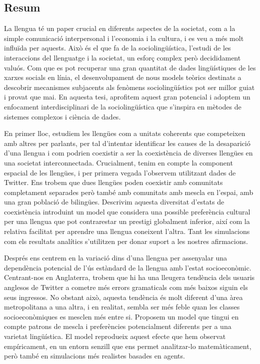 \documentclass[../thesis.tex]{subfiles}
\begin{document}
\begin{otherlanguage}{catalan}
\chapter*{Resum}
La llengua té un paper crucial en diferents aspectes de la societat, com a la simple comunicació interpersonal i l'economia i la cultura, i es veu a més molt influïda per aquests.
Això és
el que fa de la sociolingüística, l'estudi de les interaccions del llenguatge i la
societat, un esforç complex però decididament valuós. Com que es pot recuperar una gran
quantitat de dades lingüístiques de les xarxes socials en línia, el desenvolupament de
nous models teòrics destinats a descobrir mecanismes subjacents als fenòmens
sociolingüístics pot ser millor guiat i provat que mai. En aquesta tesi, aprofitem
aquest gran potencial i adoptem un enfocament interdisciplinari de la sociolingüística
que s'inspira en mètodes de sistemes complexos i ciència de dades.

En primer lloc, estudiem les llengües com a unitats coherents que competeixen amb altres
per parlants, per tal d'intentar identificar les causes de la desaparició d'una llengua i
com podrien coexistir a ser la coexistència de diverses llengües en una societat
interconnectada. Crucialment, tenim en compte la component espacial de les llengües, i
per primera vegada l'observem utilitzant dades de Twitter. Ens trobem que dues llengües poden
coexistir amb comunitats completament separades però també amb comunitats amb mescla en
l'espai, amb una gran població de bilingües. Descrivim aquesta diversitat d'estats de
coexistència introduint un model que considera una possible preferència cultural per una
llengua que pot contrarestar un prestigi globalment inferior, així com la relativa
facilitat per aprendre una llengua coneixent l'altra. Tant les simulacions com els
resultats analítics s'utilitzen per donar suport a les nostres afirmacions.

Després ens centrem en la variació dins d'una llengua per assenyalar una dependència
potencial de l'ús estàndard de la llengua amb l'estat socioeconòmic. Centrant-nos en
Anglaterra, trobem que hi ha una lleugera tendència dels usuaris anglesos de Twitter a
cometre més errors gramaticals com més baixos siguin els seus ingressos. No obstant
això, aquesta tendència és molt diferent d'una àrea metropolitana a una altra, i en
realitat, sembla ser més feble quan les classes socioeconòmiques es mesclen més entre si.
Proposem un model que tingui en compte patrons de mescla i preferències potencialment
diferents per a una varietat lingüística. El model reprodueix aquest efecte que hem observat empíricament, en
un entorn senzill que ens permet analitzar-lo matemàticament, però també en simulacions
més realistes basades en agents.


\end{otherlanguage}
\end{document}
